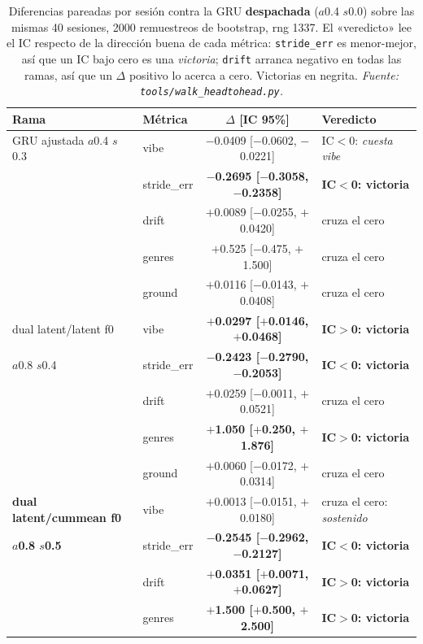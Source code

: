 \documentclass[11pt]{article}
\newcommand{\best}[1]{\textbf{#1}}
\begin{document}
\begin{table}[ht]
  \centering
  \caption{Diferencias pareadas por sesión contra la GRU \textbf{despachada}
  ($a$\num{0.4} $s$\num{0.0}) sobre las mismas \num{40} sesiones, \num{2000}
  remuestreos de bootstrap, rng \num{1337}. El «veredicto» lee el IC respecto de
  la dirección buena de cada métrica: \texttt{stride\_err} es menor-mejor, así
  que un IC bajo cero es una \emph{victoria}; \texttt{drift} arranca negativo en
  todas las ramas, así que un $\Delta$ positivo lo acerca a cero. Victorias en
  negrita. \emph{Fuente: \texttt{tools/walk\_headtohead.py}.}}
  \label{tab:walk-paired}
  {\footnotesize\setlength{\tabcolsep}{6pt}\begin{tabular}{llcl}
    \toprule
    Rama & Métrica & $\Delta$ [IC 95\%] & Veredicto \\
    \midrule
    GRU ajustada $a$\num{0.4} $s$\num{0.3} & vibe & $-$0.0409 [$-$0.0602, $-$0.0221] & IC$<$0: \emph{cuesta vibe} \\
     & stride\_err & \best{$-$0.2695 [$-$0.3058, $-$0.2358]} & \best{IC$<$0: victoria} \\
     & drift & $+$0.0089 [$-$0.0255, $+$0.0420] & cruza el cero \\
     & genres & $+$0.525 [$-$0.475, $+$1.500] & cruza el cero \\
     & ground & $+$0.0116 [$-$0.0143, $+$0.0408] & cruza el cero \\
    \midrule
    dual latent/latent f0 & vibe & \best{$+$0.0297 [$+$0.0146, $+$0.0468]} & \best{IC$>$0: victoria} \\
    $a$\num{0.8} $s$\num{0.4} & stride\_err & \best{$-$0.2423 [$-$0.2790, $-$0.2053]} & \best{IC$<$0: victoria} \\
     & drift & $+$0.0259 [$-$0.0011, $+$0.0521] & cruza el cero \\
     & genres & \best{$+$1.050 [$+$0.250, $+$1.876]} & \best{IC$>$0: victoria} \\
     & ground & $+$0.0060 [$-$0.0172, $+$0.0314] & cruza el cero \\
    \midrule
    \best{dual latent/cummean f0} & vibe & $+$0.0013 [$-$0.0151, $+$0.0180] & cruza el cero: \emph{sostenido} \\
    \best{$a$\num{0.8} $s$\num{0.5}} & stride\_err & \best{$-$0.2545 [$-$0.2962, $-$0.2127]} & \best{IC$<$0: victoria} \\
     & drift & \best{$+$0.0351 [$+$0.0071, $+$0.0627]} & \best{IC$>$0: victoria} \\
     & genres & \best{$+$1.500 [$+$0.500, $+$2.500]} & \best{IC$>$0: victoria} \\

\end{tabular}}
\end{table}
\end{document}
